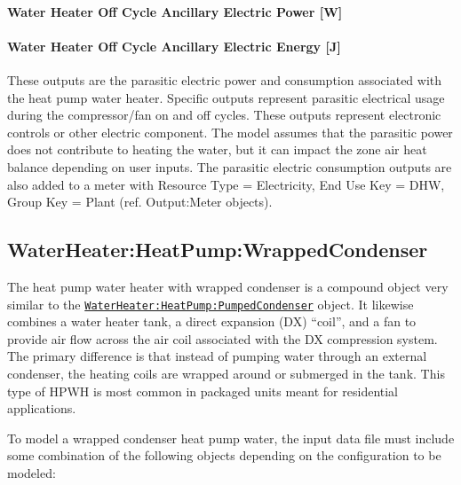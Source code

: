 \paragraph{Water Heater Off Cycle Ancillary Electric Power {[}W{]}}\label{water-heater-off-cycle-ancillary-electric-power-w}

\paragraph{Water Heater Off Cycle Ancillary Electric Energy {[}J{]}}\label{water-heater-off-cycle-ancillary-electric-energy-j}

These outputs are the parasitic electric power and consumption associated with the heat pump water heater. Specific outputs represent parasitic electrical usage during the compressor/fan on and off cycles. These outputs represent electronic controls or other electric component. The model assumes that the parasitic power does not contribute to heating the water, but it can impact the zone air heat balance depending on user inputs. The parasitic electric consumption outputs are also added to a meter with Resource Type = Electricity, End Use Key = DHW, Group Key = Plant (ref. Output:Meter objects).

\subsection{WaterHeater:HeatPump:WrappedCondenser}\label{waterheaterheatpumpwrappedcondenser}

The heat pump water heater with wrapped condenser is a compound object very similar to the \hyperref[waterheaterheatpumppumpedcondenser]{\lstinline!WaterHeater:HeatPump:PumpedCondenser!} object. It likewise combines a water heater tank, a direct expansion (DX) ``coil'', and a fan to provide air flow across the air coil associated with the DX compression system. The primary difference is that instead of pumping water through an external condenser, the heating coils are wrapped around or submerged in the tank. This type of HPWH is most common in packaged units meant for residential applications.

To model a wrapped condenser heat pump water, the input data file must include some combination of the following objects depending on the configuration to be modeled:


